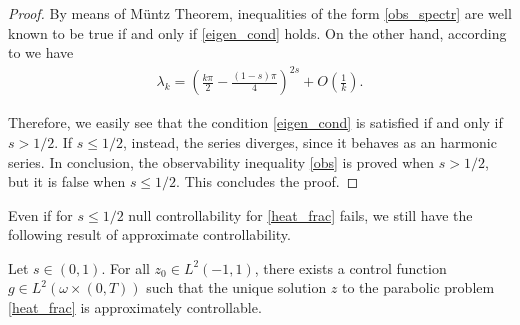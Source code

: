 \begin{proof}
By means of M\"untz Theorem, inequalities of the form \eqref{obs_spectr} are well known to be true if and only if \eqref{eigen_cond} holds. On the other hand, according to \cite{kulczycki2010spectral,kwasnicki2012eigenvalues} we have 
\begin{align*}
	\lambda_k = \left(\frac{k\pi}{2}-\frac{(1-s)\pi}{4}\right)^{2s}+O\left(\frac{1}{k}\right).
\end{align*}
 
Therefore, we easily see that the condition \eqref{eigen_cond} is satisfied if and only if $s>1/2$. If $s\leq 1/2$, instead, the series diverges, since it behaves as an harmonic series. In conclusion, the observability inequality \eqref{obs} is proved when $s>1/2$, but it is false when $s\leq 1/2$. This concludes the proof. 
\end{proof}

Even if for $s\leq 1/2$ null controllability for \eqref{heat_frac} fails, we still have the following result of approximate controllability. 

\begin{proposition}
Let $s\in(0,1)$. For all $z_0\in L^2(-1,1)$, there exists a control function $g\in L^2(\omega\times(0,T))$ such that the unique solution $z$ to the parabolic problem \eqref{heat_frac} is approximately controllable.
\end{proposition}

